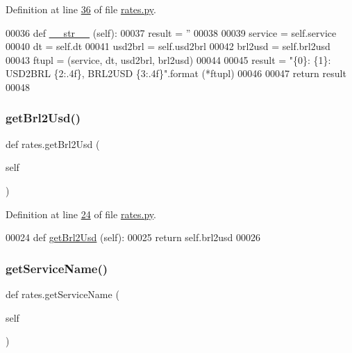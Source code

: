 Definition at line \hyperlink{rates_8py_source_l00036}{36} of file \hyperlink{rates_8py_source}{rates.\+py}.


\begin{DoxyCode}
00036     \textcolor{keyword}{def }\hyperlink{namespacerates_a2f1a70c33ee9e255938e4c19fd207264}{\_\_str\_\_} (self):
00037         result = \textcolor{stringliteral}{''}
00038 
00039         service = self.service
00040         dt      = self.dt
00041         usd2brl = self.usd2brl
00042         brl2usd = self.brl2usd
00043         ftupl = (service, dt, usd2brl, brl2usd)
00044         
00045         result = \textcolor{stringliteral}{"\{0\}: \{1\}: USD2BRL \{2:.4f\}, BRL2USD \{3:.4f\}"}.format (*ftupl)
00046 
00047         \textcolor{keywordflow}{return} result        
00048     
\end{DoxyCode}
\mbox{\label{namespacerates_a083f2cdcd71554d301bcbfb0779ffa49}} 
\subsubsection{\texorpdfstring{get\+Brl2\+Usd()}{getBrl2Usd()}}
{\footnotesize\ttfamily def rates.\+get\+Brl2\+Usd (\begin{DoxyParamCaption}\item[{}]{self }\end{DoxyParamCaption})}



Definition at line \hyperlink{rates_8py_source_l00024}{24} of file \hyperlink{rates_8py_source}{rates.\+py}.


\begin{DoxyCode}
00024     \textcolor{keyword}{def }\hyperlink{namespacerates_a083f2cdcd71554d301bcbfb0779ffa49}{getBrl2Usd} (self):
00025         \textcolor{keywordflow}{return} self.brl2usd
00026     
\end{DoxyCode}
\mbox{\label{namespacerates_a5dd7b6601bc66e313c26984e32f1e290}} 
\subsubsection{\texorpdfstring{get\+Service\+Name()}{getServiceName()}}
{\footnotesize\ttfamily def rates.\+get\+Service\+Name (\begin{DoxyParamCaption}\item[{}]{self }\end{DoxyParamCaption})}



